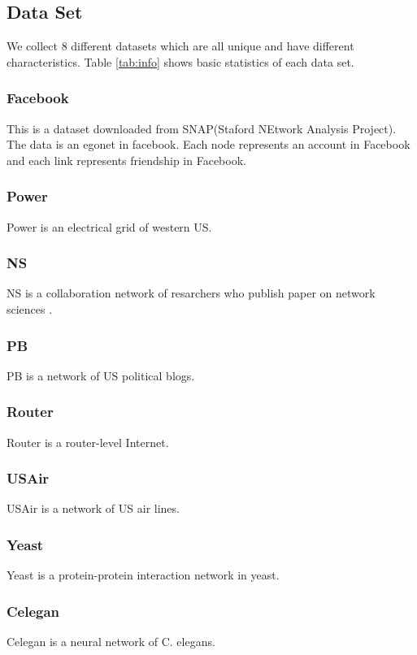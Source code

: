 \documentclass[12pt]{article}
\begin{document}
	\subsection {Data Set}
	We collect 8 different datasets which are all unique and have different characteristics. Table \ref{tab:info} shows basic statistics of each data set.
	\subsubsection{Facebook}
	This is a dataset downloaded from SNAP(Staford NEtwork Analysis Project)\cite{snapnets}. The data is an egonet in facebook. Each node represents an account in Facebook and each link represents friendship in Facebook.
	\subsubsection{Power}
	Power is  an electrical grid of western US\cite{small_world}.
	\subsubsection{NS}
	NS is a collaboration network of resarchers who publish paper on network sciences \cite{Newman_2006}.
	\subsubsection{PB}
	PB is a network of US political blogs.\cite{pb}
	\subsubsection{Router}
	Router is a router-level Internet.\cite{router}
	\subsubsection{USAir}
	USAir is a network of US air lines. \cite{usair}
	\subsubsection{Yeast}
	Yeast is a protein-protein interaction network in yeast.\cite{yeast}
	
	\subsubsection{Celegan}
	Celegan is a neural network of C. elegans.\cite{small_world}
	
\end{document}
